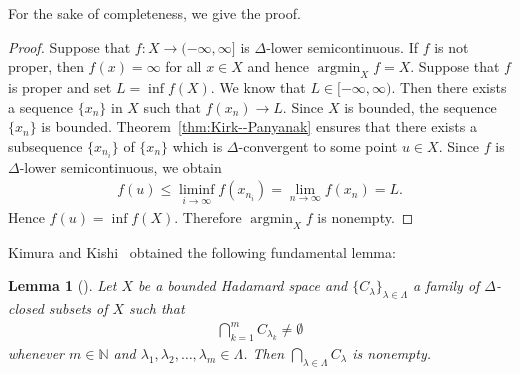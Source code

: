 \documentclass[draft]{amsart}
\numberwithin{equation}{section}
\def\N{\mathbb N}
\DeclareMathOperator*{\Argmin}{argmin}
\theoremstyle{plain}
\newtheorem{lemma}[theorem]{Lemma}
\theoremstyle{definition}
\theoremstyle{remark}
\begin{document}
For the sake of completeness, we give the proof. 

\begin{proof}
 Suppose that $f\colon X\to (-\infty, \infty]$ is $\Delta$-lower semicontinuous. 
 If $f$ is not proper, then $f(x)=\infty$ for all $x\in X$ and hence 
 $\Argmin_X f=X$. Suppose that $f$ is proper and 
 set $L=\inf f(X)$. We know that $L\in [-\infty, \infty)$. 
 Then there exists a sequence $\{x_n\}$ in $X$ such that 
 $f(x_n)\to L$. Since $X$ is bounded, the sequence $\{x_n\}$ 
 is bounded. Theorem~\ref{thm:Kirk--Panyanak} ensures that 
 there exists a subsequence $\{x_{n_i}\}$ of $\{x_n\}$ 
 which is $\Delta$-convergent to some point $u\in X$. 
 Since $f$ is $\Delta$-lower semicontinuous, we obtain 
 \begin{align}
  f(u)\leq \liminf_{i\to \infty}f(x_{n_i}) 
 =\lim_{n\to \infty}f(x_n) = L. 
 \end{align}
 Hence $f(u)=\inf f(X)$. Therefore $\Argmin_X f$ is nonempty. 
\end{proof}

Kimura and Kishi~\cite{MR3897196} obtained the following 
fundamental lemma: 

\begin{lemma}[{\cite[Lemma~3.3]{MR3897196}}]\label{lem:Delta-compact}
 Let $X$ be a bounded Hadamard space and  
 $\{C_{\lambda}\}_{\lambda\in \Lambda}$ a family of 
 $\Delta$-closed subsets of $X$ 
 such that 
 \begin{align}
  \bigcap_{k=1}^m C_{\lambda_k}\neq \emptyset
 \end{align}
 whenever $m\in \N$ and $\lambda_1,\lambda_2,\dots ,\lambda_m\in \Lambda$. 
 Then $\bigcap_{\lambda\in \Lambda}C_{\lambda}$ is nonempty. 
\end{lemma}
\end{document}
